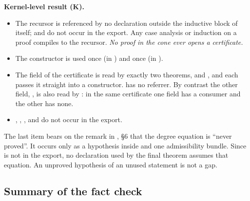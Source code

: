 \begin{verdictbox}
\textbf{Kernel-level result (K).}
\begin{itemize}
\item The recursor  is referenced by no declaration outside the inductive block of  itself;  and  do not occur in the export.
Any case analysis or induction on a  proof compiles to the recursor. \emph{No proof in the cone ever opens a}  \emph{certificate.}
\item The constructor  is used once (in ) and  once (in ).
\item The  field of the certificate  is read by exactly two theorems,  and , and each passes it straight into a  constructor.  has no referrer.
By contrast the other field, , is also read by : in the same certificate one field has a consumer and the other has none.
\item {}, , ,  and  do not occur in the export.
\end{itemize}
\end{verdictbox}

The last item bears on the remark in \N, \S6 that the degree equation is ``never proved''. It occurs only as a hypothesis inside  and one admissibility bundle.
Since  is not in the export, no declaration used by the final theorem assumes that equation. An unproved hypothesis of an unused statement is not a gap. \Fnote

\subsection{Summary of the fact check}

